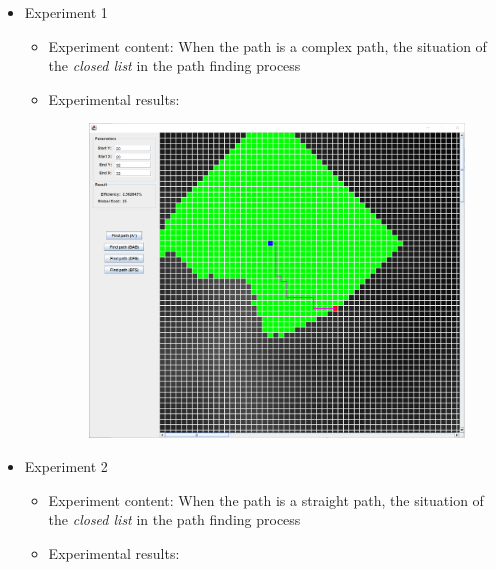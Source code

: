 \documentclass[
]{article}
\begin{document}
\begin{itemize}
\item
  Experiment 1

  \begin{itemize}
  \item
    Experiment content: When the path is a complex path, the situation
    of the \emph{closed list} in the path finding process
  \item
    Experimental results:

    \begin{figure}
    \centering
    \includegraphics{./images/image-20210523071650111.png}
    \caption{}
    \end{figure}
  \end{itemize}
\item
  Experiment 2

  \begin{itemize}
  \item
    Experiment content: When the path is a straight path, the situation
    of the \emph{closed list} in the path finding process
  \item
    Experimental results:


\end{itemize}
\end{itemize}
\end{document}
